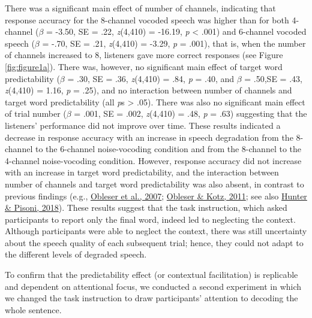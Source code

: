 \documentclass[a4paper, nobind]{templates/ociamthesis}
\begin{document}
There was a significant main effect of number of channels, indicating that response accuracy for the 8-channel vocoded speech was higher than for both
4-channel (\(\beta\) = -3.50, SE = .22, \emph{z}(4,410) = -16.19, \emph{p} \textless{} .001)
and 6-channel vocoded speech (\(\beta\) = -.70, SE = .21, \emph{z}(4,410) = -3.29, \emph{p} = .001),
that is, when the number of channels increased to 8, listeners gave more correct responses (see Figure \ref{fig:figure1a}).
There was, however, no significant main effect of target word predictability
(\(\beta\) = .30, SE = .36, \emph{z}(4,410) = .84, \emph{p} = .40, and \(\beta\) = .50,SE = .43, \emph{z}(4,410) = 1.16, \emph{p} = .25),
and no interaction between number of channels and target word predictability (all \emph{p}s \textgreater{} .05).
There was also no significant main effect of trial number
(\(\beta\) = .001, SE = .002, \emph{z}(4,410) = .48, \emph{p} = .63) suggesting that the listeners' performance did not improve over time.
These results indicated a decrease in response accuracy with an increase in speech degradation from the 8-channel to the 6-channel noise-vocoding condition and from the 8-channel to the 4-channel noise-vocoding condition.
However, response accuracy did not increase with an increase in target word predictability, and the interaction between number of channels and target word predictability was also absent,
in contrast to previous findings (e.g., \protect\hyperlink{ref-Obleser2007}{Obleser et al., 2007}; \protect\hyperlink{ref-Obleser2011}{Obleser \& Kotz, 2011}; see also \protect\hyperlink{ref-Hunter2018}{Hunter \& Pisoni, 2018}).
These results suggest that the task instruction, which asked participants to report only the final word, indeed led to neglecting the context.
Although participants were able to neglect the context, there was still uncertainty about the speech quality of each subsequent trial;
hence, they could not adapt to the different levels of degraded speech.

To confirm that the predictability effect (or contextual facilitation) is replicable and dependent on attentional focus, we conducted a second experiment in which we changed the task instruction to draw participants' attention to decoding the whole sentence.
\end{document}
